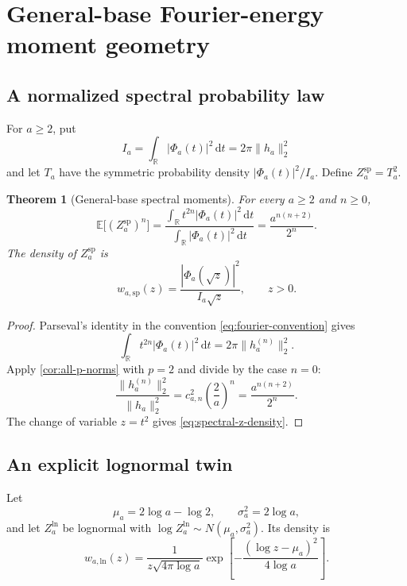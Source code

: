 \documentclass[11pt,oneside]{article}
\newtheorem{theorem}{Theorem}[section]
\theoremstyle{definition}
\theoremstyle{remark}
\newcommand{\R}{\mathbb R}
\newcommand{\dd}{\,\mathrm d}
\newcommand{\E}{\mathbb E}
\begin{document}
\section{General-base Fourier-energy moment geometry}
\label{sec:spectral-general}

\subsection{A normalized spectral probability law}

For $a\ge2$, put
\begin{equation}
 I_a=\int_{\R}|\Phi_a(t)|^2\dd t=2\pi\|h_a\|_2^2
 \label{eq:Ia-spectral}
\end{equation}
and let $T_a$ have the symmetric probability density $|\Phi_a(t)|^2/I_a$.  Define
$Z_a^{\mathrm{sp}}=T_a^2$.

\begin{theorem}[General-base spectral moments]
\label{thm:general-spectral-moments}
For every $a\ge2$ and $n\ge0$,
\begin{equation}
 \boxed{\quad
 \E\bigl[(Z_a^{\mathrm{sp}})^n\bigr]
 =\frac{\displaystyle\int_{\R}t^{2n}|\Phi_a(t)|^2\dd t}
        {\displaystyle\int_{\R}|\Phi_a(t)|^2\dd t}
 =\frac{a^{n(n+2)}}{2^n}.
 \quad}
 \label{eq:general-spectral-moments}
\end{equation}
The density of $Z_a^{\mathrm{sp}}$ is
\begin{equation}
 w_{a,\mathrm{sp}}(z)=
 \frac{|\Phi_a(\sqrt z)|^2}{I_a\sqrt z},\qquad z>0.
 \label{eq:spectral-z-density}
\end{equation}
\end{theorem}

\begin{proof}
Parseval's identity in the convention \eqref{eq:fourier-convention} gives
\[
 \int_{\R}t^{2n}|\Phi_a(t)|^2\dd t=2\pi\|h_a^{(n)}\|_2^2.
\]
Apply \cref{cor:all-p-norms} with $p=2$ and divide by the case $n=0$:
\[
 \frac{\|h_a^{(n)}\|_2^2}{\|h_a\|_2^2}
 =c_{a,n}^2\left(\frac2a\right)^n
 =\frac{a^{n(n+2)}}{2^n}.
\]
The change of variable $z=t^2$ gives \eqref{eq:spectral-z-density}.
\end{proof}

\subsection{An explicit lognormal twin}

Let
\begin{equation}
 \mu_a=2\log a-\log2,
 \qquad \sigma_a^2=2\log a,
 \label{eq:lognormal-parameters}
\end{equation}
and let $Z_a^{\mathrm{ln}}$ be lognormal with
$\log Z_a^{\mathrm{ln}}\sim N(\mu_a,\sigma_a^2)$.  Its density is
\begin{equation}
 w_{a,\mathrm{ln}}(z)=
 \frac1{z\sqrt{4\pi\log a}}
 \exp\!\left[-\frac{(\log z-\mu_a)^2}{4\log a}\right].
 \label{eq:lognormal-twin-density}
\end{equation}
\end{document}
